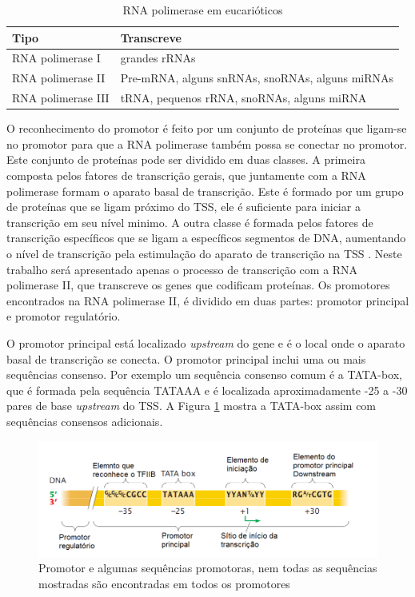 \begin{table}[H] 
\begin{tabularx}{\textwidth}{ |X|X| }    \hline 
		  	Tipo      & Transcreve\\ \hline \hline

    RNA polimerase I  & grandes rRNAs  \\ \hline
    RNA polimerase II & Pre-mRNA, alguns snRNAs, snoRNAs, alguns miRNAs\\ \hline
    RNA polimerase III & tRNA, pequenos rRNA, snoRNAs, alguns miRNA \\ \hline
\end{tabularx}
\caption{RNA polimerase em eucarióticos \cite[Adaptada]{Pierce2012}}
\label{TabRNApol}
\end{table}

O reconhecimento do promotor é feito por um conjunto de proteínas que ligam-se no promotor para que a RNA polimerase também possa se conectar no promotor. Este conjunto de proteínas pode ser dividido em duas classes. A primeira composta pelos fatores de transcrição gerais, que juntamente com a RNA polimerase formam o aparato basal de transcrição. Este é formado por um grupo de proteínas que se ligam próximo do TSS, ele é suficiente para iniciar a transcrição em seu nível minimo. A outra classe é formada pelos fatores de transcrição específicos que se ligam a específicos segmentos de DNA, aumentando o nível de transcrição pela estimulação do aparato de transcrição na TSS \cite{Pierce2012}. Neste trabalho será apresentado apenas o processo de transcrição com a RNA polimerase II, que transcreve os genes que codificam proteínas. Os promotores encontrados na RNA polimerase II, é dividido em duas partes: promotor principal e promotor regulatório.

O promotor principal está localizado \textit{upstream} do gene e é o local onde o aparato basal de transcrição se conecta. O promotor principal inclui uma ou mais sequências consenso. Por exemplo um sequência consenso comum é a TATA-box, que é formada pela sequência TATAAA e é localizada aproximadamente -25 a -30 pares de base \textit{upstream} do TSS. A Figura \ref{fig:seq_consenso} mostra a TATA-box assim com sequências consensos adicionais.


\begin{figure}[H]
    \centering
    \includegraphics[scale=0.7]{./figuras/seq_consenso.png}
    \caption{Promotor e algumas sequências promotoras, nem todas as sequências mostradas são encontradas em todos os promotores \cite[Adaptada]{Pierce2012}}
    \label{fig:seq_consenso}
\end{figure}

